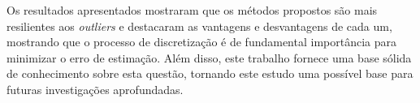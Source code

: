 Os resultados apresentados mostraram que os métodos propostos são mais resilientes aos \textit{outliers} e destacaram as vantagens e desvantagens de cada um, mostrando que o processo de discretização é de fundamental importância para minimizar o erro de estimação. Além disso, este trabalho fornece uma base sólida de conhecimento sobre esta questão, tornando este estudo uma possível base para futuras investigações aprofundadas.
